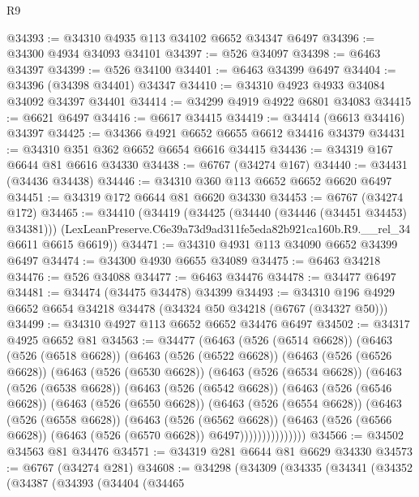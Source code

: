 \begin{lexlean}{R9}
\begin{coremodule}
@34393 := @34310 @4935 @113 @34102 @6652 @34347 @6497
@34396 := @34300 @4934 @34093 @34101
@34397 := @526 @34097
@34398 := @6463 @34397
@34399 := @526 @34100
@34401 := @6463 @34399 @6497
@34404 := @34396 (@34398 @34401) @34347
@34410 := @34310 @4923 @4933 @34084 @34092 @34397 @34401
@34414 := @34299 @4919 @4922 @6801 @34083
@34415 := @6621 @6497
@34416 := @6617 @34415
@34419 := @34414 (@6613 @34416) @34397
@34425 := @34366 @4921 @6652 @6655 @6612 @34416 @34379
@34431 := @34310 @351 @362 @6652 @6654 @6616 @34415
@34436 := @34319 @167 @6644 @81 @6616 @34330
@34438 := @6767 (@34274 @167)
@34440 := @34431 (@34436 @34438)
@34446 := @34310 @360 @113 @6652 @6652 @6620 @6497
@34451 := @34319 @172 @6644 @81 @6620 @34330
@34453 := @6767 (@34274 @172)
@34465 := @34410
    (@34419
      (@34425 (@34440 (@34446 (@34451 @34453) @34381)))
      (LexLeanPreserve.C6e39a73d9ad311fe5eda82b921ca160b.R9.__rel_34 @6611 @6615 @6619))
@34471 := @34310 @4931 @113 @34090 @6652 @34399 @6497
@34474 := @34300 @4930 @6655 @34089
@34475 := @6463 @34218
@34476 := @526 @34088
@34477 := @6463 @34476
@34478 := @34477 @6497
@34481 := @34474 (@34475 @34478) @34399
@34493 := @34310 @196 @4929 @6652 @6654 @34218 @34478 (@34324 @50 @34218 (@6767 (@34327 @50)))
@34499 := @34310 @4927 @113 @6652 @6652 @34476 @6497
@34502 := @34317 @4925 @6652 @81
@34563 := @34477
    (@6463
      (@526 (@6514 @6628))
      (@6463
        (@526 (@6518 @6628))
        (@6463
          (@526 (@6522 @6628))
          (@6463
            (@526 (@6526 @6628))
            (@6463
              (@526 (@6530 @6628))
              (@6463
                (@526 (@6534 @6628))
                (@6463
                  (@526 (@6538 @6628))
                  (@6463
                    (@526 (@6542 @6628))
                    (@6463
                      (@526 (@6546 @6628))
                      (@6463
                        (@526 (@6550 @6628))
                        (@6463
                          (@526 (@6554 @6628))
                          (@6463
                            (@526 (@6558 @6628))
                            (@6463
                              (@526 (@6562 @6628))
                              (@6463
                                (@526 (@6566 @6628))
                                (@6463 (@526 (@6570 @6628)) @6497)))))))))))))))
@34566 := @34502 @34563 @81 @34476
@34571 := @34319 @281 @6644 @81 @6629 @34330
@34573 := @6767 (@34274 @281)
@34608 := @34298
    (@34309
      (@34335
        (@34341
          (@34352
            (@34387
              (@34393
                (@34404
                  (@34465

\end{coremodule}
\end{lexlean}
